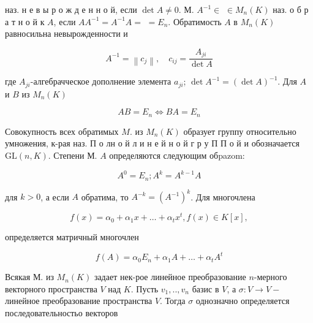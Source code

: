 \documentclass[10pt]{article}
\begin{document}
наз. н е в ы р о ж д е н н о й, если $\operatorname{det} A \neq 0$. М. $A^{-1} \in$ $\in M_{n}(K)$ наз. о б р а т н о й к $A$, если $A A^{-1}=A^{-1} A=$ $=E_{n}$. Обратимость $A$ в $M_{n}(K)$ равносильна невырожденности и



\[

A^{-1}=\left\|c_{j}\right\|, \quad c_{i j}=\frac{A_{j i}}{\operatorname{det} A}

\]



где $A_{j i}$-алгебрачческое дополнение элемента $a_{j i}$; $\operatorname{det} A^{-1}=(\operatorname{det} A)^{-1}$. Для $A$ и $B$ из $M_{n}(K)$



\[

A B=E_{n} \Longleftrightarrow B A=E_{n}

\]



Совокупность всех обратимых $M$. из $M_{n}(K)$ образует группу относительно умножения, к-рая наз. П о лн о й л и н е й н о й г р у П П о й и обозначается $\mathrm{GL}(n, K)$. Степени М. $A$ определяются следующим обpazom:



\[

A^{0}=E_{n} ; A^{k}=A^{k-1} A

\]



для $k>0$, а если $A$ обратима, то $A^{-k}=\left(A^{-1}\right)^{k}$. Для многочлена



\[

f(x)=\alpha_{0}+\alpha_{1} x+\ldots+\alpha_{t} x^{t}, f(x) \in K[x],

\]



определяется матричный многочлен



\[

f(A)=\alpha_{0} E_{n}+\alpha_{1} A+\ldots+\alpha_{t} A^{t}

\]



Всякая М. из $M_{n}(K)$ задает нек-рое линейное преобразование $n$-мерного векторного пространства $V$ над $K$. Пусть $v_{1}, . ., v_{n}$ базис в $V$, а $\sigma: V \rightarrow V-$ линейное преобразование пространства $V$. Тогда $\sigma$ однозначно определяется последовательностьо векторов
\end{document}
